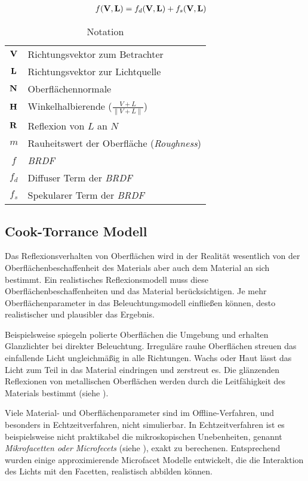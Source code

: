 \begin{align}
	f(\mathbf V,\mathbf L) &= f_d(\mathbf V,\mathbf L) + f_s(\mathbf V,\mathbf L)
	\label{eq:brdf-dekonstruiert}
\end{align}

\begin{table}
\centering
\begin{tabular}{c l}
\hline
	$\mathbf V$ 		& Richtungsvektor zum Betrachter \\
	$\mathbf L$ 		& Richtungsvektor zur Lichtquelle \\
	$\mathbf N$ 		& Oberflächennormale \\
	$\mathbf H$ 		& Winkelhalbierende ($\frac{V + L}{\|V + L\|}$) \\
	$\mathbf R$ 		& Reflexion von $L$ an $N$ \\
	$m$ 	 	& Rauheitswert der Oberfläche (\textit{Roughness}) \\
 	$f$ 		& \textit{BRDF} \\
	$f_d$ 		& Diffuser Term der \textit{BRDF} \\
	$f_s$ 		& Spekularer Term der \textit{BRDF}\\
\hline
\end{tabular}
\caption[Notation \textit{BRDF}]{Notation}
\label{tab:pbr-notation}
\end{table}


\subsection{Cook-Torrance Modell}

Das Reflexionsverhalten von Oberflächen wird in der Realität wesentlich von der Oberflächenbeschaffenheit des Materials aber auch dem Material an sich bestimmt. Ein realistisches Reflexionsmodell muss diese Oberflächenbeschaffenheiten und das Material berücksichtigen. Je mehr Oberflächenparameter in das Beleuchtungsmodell einfließen können, desto realistischer und plausibler das Ergebnis.

Beispielsweise spiegeln polierte Oberflächen die Umgebung und erhalten Glanzlichter bei direkter Beleuchtung. Irreguläre rauhe Oberflächen streuen das einfallende Licht ungleichmäßig in alle Richtungen. Wachs oder Haut lässt das Licht zum Teil in das Material eindringen und zerstreut es. Die glänzenden Reflexionen von metallischen Oberflächen werden durch die Leitfähigkeit des Materials bestimmt (siehe ).

Viele Material- und Oberflächenparameter sind im Offline-Verfahren, und besonders in Echtzeitverfahren, nicht simulierbar. In Echtzeitverfahren ist es beispielsweise nicht praktikabel die mikroskopischen Unebenheiten, genannt \textit{Mikrofacetten oder Microfecets} (siehe ), exakt zu berechenen. Entsprechend wurden einige approximierende Microfacet Modelle entwickelt, die die Interaktion des Lichts mit den Facetten, realistisch abbilden können.

